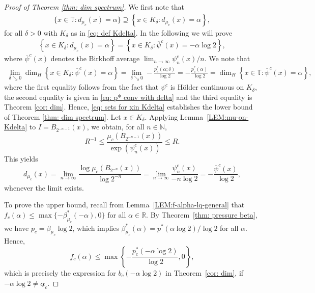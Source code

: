 \documentclass[11pt,reqno]{amsart}
\theoremstyle{plain}
\theoremstyle{definition}
\newcommand{\R}{{\mathbb R}}
\newcommand{\N}{{\mathbb N}}
\newcommand{\T}{{\mathbb T}}
\begin{document}
\begin{proof}[Proof of Theorem \ref{thm: dim spectrum}]
We first note that
\begin{align*}
 \{x\in  \T \colon  d_{\mu_c}(x) = \alpha\}
 \supseteq \left\{x\in K_{\delta} \colon d_{\mu_c} (x) = \alpha\right\},
\end{align*}
for all $\delta>0$ with $K_{\delta}$ as in \eqref{eq: def Kdelta}.
 In the following we will prove
\begin{align}
 \left\{x\in K_{\delta} \colon d_{ \mu_c} (x) = \alpha\right\}
 =\left\{x \in K_{\delta} \colon \overline{\psi}^c(x) = - \alpha \log 2\right \},\label{eq: sets for xin Kdelta}
\end{align}
where $\overline{\psi}^c(x)$ denotes the Birkhoff average $\lim_{n\to\infty}\psi_n^c(x)/n$.
We  note that 
\begin{align*}
\lim_{\delta\searrow 0}\dim_H\left\{x \in K_{\delta} \colon \overline{\psi}^c(x) =\alpha\right\}
= \lim_{\delta\searrow 0}-\frac{p_c^*(\alpha;\delta)}{\log 2}
=-\frac{p_c^*(\alpha)}{\log 2}
= \dim_H\left\{x \in \mathbb{T} \colon \overline{\psi}^c(x)=\alpha\right\},
\end{align*}
where the first equality follows from the fact that $\psi^c$ is H\"older continuous on $K_{\delta}$, the second equality is given in \eqref{eq: p* conv with delta} and the third equality is Theorem \ref{cor: dim}. 
Hence, \eqref{eq: sets for xin Kdelta} establishes the lower bound of Theorem \ref{thm: dim spectrum}.
Let $x \in K_\delta$. Applying Lemma~\ref{LEM:mu-on-Kdelta} to $I = B_{2^{-n-1}}(x)$, we obtain, for all $n \in \N$,
\[
R^{-1} \leqslant \frac{\mu_c(B_{2^{-n-1}}(x))}{\exp(\psi^c_n(x))} \leqslant R.
\]
This yields
\[
d_{\mu_c}(x) = \lim_{n \to \infty} \frac{\log \mu_c(B_{2^{-n}}(x))}{\log 2^{-n}} = \lim_{n \to \infty} \frac{\psi^c_n(x)}{-n \log 2} 
=- \frac{\overline{\psi}^c(x)}{\log 2},
\]
whenever the limit exists.

 
To prove the upper bound, recall from Lemma~\ref{LEM:f-alpha-lq-general} that $f_c(\alpha) \leqslant \max\{-\beta_{\mu_c}^{\ast}(-\alpha),0\}$ for all $\alpha \in \R$. By Theorem~\ref{thm: pressure beta}, we have $p_c =\beta_{\mu_c} \log 2$, which implies $\beta^{\ast}_{\mu_c}(\alpha) = p^{\ast}(\alpha \log 2)/\log 2$ for all $\alpha$. Hence,
 \[
 f_c(\alpha) \leqslant \max\left\{ - \frac{p_c^\ast(- \alpha \log 2)}{\log 2},0 \right\},
 \]
 which is precisely the expression for $b_c(- \alpha \log 2)$ in Theorem~\ref{cor: dim}, if $-\alpha \log 2 \neq \underline{\alpha}_c$.
\end{proof}
\end{document}
